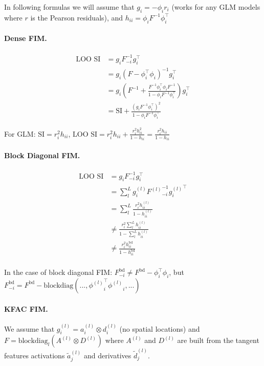 \documentclass[11pt]{article}
\begin{document}
In following formulas we will assume that $g_i = -\phi_i r_i$ (works for any GLM models where $r$ is the Pearson residuals), and $h_{ii}=\phi_i F^{-1} \phi_i^{\top}$

\paragraph{Dense FIM.}

\begin{align*}
	\text{LOO SI}&=g_i F^{-1}_{-i}g_i^{\top}\\
	&=g_i \left(F - \phi_i^{\top} \phi_i\right)^{-1}g_i^{\top}\\
	&=g_i (F^{-1} + \frac{F^{-1}\phi_i^{\top}\phi_i F^{-1}}{1 - \phi_i F^{-1} \phi_i^{\top}})g_i^{\top}\\
	&=\text{SI} + \frac{(g_i F^{-1} \phi_i^{\top})^2}{1- \phi_i F^{-1} \phi_i^{\top}}
\end{align*}

For GLM: $\text{SI}= r_i^2 h_{ii}$, $\text{LOO SI}= r_i^2 h_{ii} + \frac{r_i^2 h_{ii}^2}{1-h_{ii}}=\frac{r_i^2 h_{ii}}{1-h_{ii}}$

\paragraph{Block Diagonal FIM.}

\begin{align*}
	\text{LOO SI}&=g_i F^{-1}_{-i}g_i^{\top}\\
	&=\sum_l^L g^{(l)}_i {F^{(l)}}^{-1}_{-i}{g^{(l)}_i}^{\top}\\
	&=\sum_l^L \frac{r_i^2 h^{(l)}_{ii}}{1-h^{(l)}_{ii}}\\
	&\neq\frac{r_i^2  \sum_l^L h^{(l)}_{ii}}{1- \sum_l^L h^{(l)}_{ii}}\\
	&\neq\frac{r_i^2   h^{\text{bd}}_{ii}}{1- h^{\text{bd}}_{ii}}\\
\end{align*}

In the case of block diagonal FIM: $F^{\text{bd}}_{-i}\neq F^{\text{bd}} - \phi_i^{\top}\phi_i$, but $F^{\text{bd}}_{-i} = F^{\text{bd}} - \text{blockdiag}\left(..., {\phi^{(l)}}_i^{\top}{\phi^{(l)}}_i, ... \right)$

\paragraph{KFAC FIM.}
We assume that $g^{(l)}_i=a^{(l)}_i\otimes d^{(l)}_i$ (no spatial locations) and $F=\text{blockdiag}_l\left( A^{(l)}\otimes D^{(l)}\right)$ where $A^{(l)}$ and $D^{(l)}$ are built from the tangent features activations $\tilde{a}^{(l)}_j$ and derivatives $\tilde{d}^{(l)}_j$.
\end{document}
